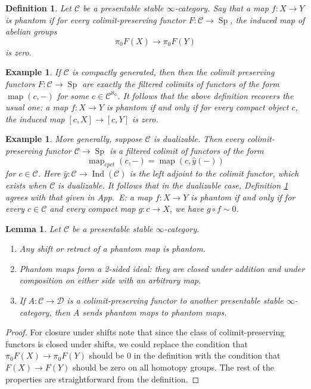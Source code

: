 \documentclass[12pt]{article}
\newtheorem{lemma}[theorem]{Lemma}
\newtheorem{definition}[theorem]{Definition}
\newtheorem{example}[theorem]{Example}
\newcommand{\on}{\operatorname}
\begin{document}
\begin{definition}\label{phantomdef}
Let $\mathcal{C}$ be a presentable stable $\infty$-category.  Say that a map $f:X\to Y$ is \emph{phantom} if for every colimit-preserving functor $F:\mathcal{C}\to\on{Sp}$, the induced map of abelian groups
$$\pi_0 F(X)\to \pi_0 F(Y)$$
is zero.
\end{definition}

\begin{example}
If $\mathcal{C}$ is compactly generated, then then the colimit preserving functors $F:\mathcal{C}\to\on{Sp}$ are exactly the filtered colimits of functors of the form $\on{map}(c,-)$ for some $c\in\mathcal{C}^{\aleph_0}$.  It follows that the above definition recovers the usual one: a map $f:X\to Y$ is phantom if and only if for every compact object $c$, the induced map $[c,X]\to[c,Y]$ is zero.
\end{example}

\begin{example}
More generally, suppose $\mathcal{C}$ is \emph{dualizable}. Then every colimit-preserving functor $\mathcal{C}\to\on{Sp}$ is a filtered colimit of functors of the form
$$\on{map}_{cpct}(c,-) = \on{map}(c,\hat{y}(-))$$
for $c\in\mathcal{C}$.  Here $\hat{y}:\mathcal{C}\to\on{Ind}(\mathcal{C})$ is the \emph{left} adjoint to the colimit functor, which exists when $\mathcal{C}$ is dualizable.  It follows that in the dualizable case, Definition \ref{phantomdef} agrees with that given in \cite{EfimovKtheory} App.\ E: a map $f:X\to Y$ is phantom if and only if for every $c\in \mathcal{C}$ and every compact map $g:c\to X$, we have $g\circ f\sim 0$.
\end{example}

\begin{lemma}\label{phantomobvious}
Let $\mathcal{C}$ be a presentable stable $\infty$-category.
\begin{enumerate}
\item Any shift or retract of a phantom map is phantom.
\item Phantom maps form a 2-sided ideal: they are closed under addition and under composition on either side with an arbitrary map.
\item If $A:\mathcal{C}\to\mathcal{D}$ is a colimit-preserving functor to another presentable stable $\infty$-category, then $A$ sends phantom maps to phantom maps.
\end{enumerate}
\end{lemma}
\begin{proof}
For closure under shifts note that since the class of colimit-preserving functors is closed under shifts, we could replace the condition that $\pi_0F(X)\to \pi_0F(Y)$ should be $0$ in the definition with the condition that $F(X)\to F(Y)$ should be zero on all homotopy groups.  The rest of the properties are straightforward from the definition.
\end{proof}
\end{document}
